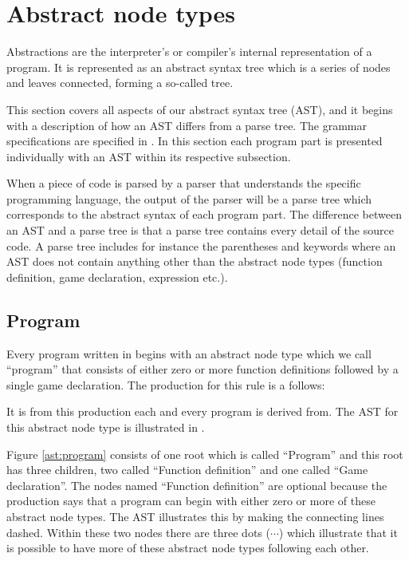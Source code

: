 \section{Abstract node types}
\label{sec:ant}

Abstractions are the interpreter's or compiler's internal representation of a program. It is represented as an abstract syntax tree which is a series of nodes and leaves connected, forming a so-called tree.%

This section covers all aspects of our abstract syntax tree (AST), and it begins with a description of how an AST differs from a parse tree. 
The grammar specifications are specified in . In this section each program part is presented individually with an AST within its respective subsection.%

When a piece of code is parsed by a parser that understands the specific programming language, the output of the parser will be a parse tree which corresponds to the abstract syntax of each program part. The difference between an AST and a parse tree is that a parse tree contains every detail of the source code. A parse tree includes for instance the parentheses and keywords where an AST does not contain anything other than the abstract node types (function definition, game declaration, expression etc.).%

\subsection{Program}%
Every program written in \productname{} begins with an abstract node type which we call ``program'' that consists of either zero or more function definitions followed by a single game declaration. The production for this rule is a follows:%

\begin{ebnf}%
%
\end{ebnf}%

It is from this production each and every program is derived from. The AST for this abstract node type is illustrated in .%

%

Figure \ref{ast:program} consists of one root which is called ``Program'' and this root has three children, two called ``Function definition'' and one called ``Game declaration''. The nodes named ``Function definition'' are optional because the production says that a program can begin with either zero or more of these abstract node types. The AST illustrates this by making the connecting lines dashed. Within these two nodes there are three dots ($\cdots$) which illustrate that it is possible to have more of these abstract node types following each other.%


